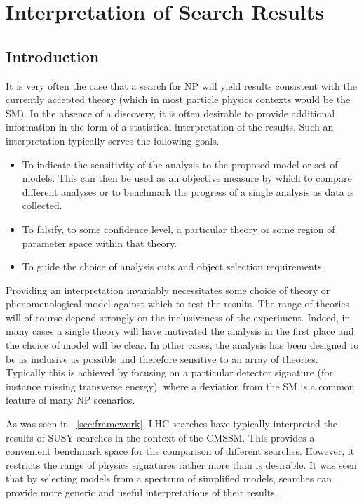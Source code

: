 \chapter{Interpretation of Search Results}
\label{sec:interpretation}
\section{Introduction}
It is very often the case that a search for \ac{NP} will yield results
consistent with the currently accepted theory (which in most particle physics
contexts would be the \ac{SM}). In the absence of a discovery, it is often
desirable to provide additional information in the form of a statistical
interpretation of the results. Such an interpretation typically serves the
following goals.
\begin{itemize}
\item To indicate the sensitivity of the analysis to the proposed model or set
  of models. This can then be used as an objective measure by which to compare
  different analyses or to benchmark the progress of a single analysis as data
  is collected.
\item To falsify, to some confidence level, a particular theory or some region
  of parameter space within that theory.
\item To guide the choice of analysis cuts and object selection requirements.
\end{itemize}

Providing an interpretation invariably necessitates some choice of theory or
phenomenological model against which to test the results. The range of theories
will of course depend strongly on the inclusiveness of the experiment. Indeed,
in many cases a single theory will have motivated the analysis in the first
place and the choice of model will be clear. In other cases, the analysis has
been designed to be as inclusive as possible and therefore sensitive to an array
of theories. Typically this is achieved by focusing on a particular detector
signature (for instance missing transverse energy), where a deviation from the
\ac{SM} is a common feature of many \ac{NP} scenarios.

As was seen in \chap~\ref{sec:framework}, \ac{LHC} searches have typically
interpreted the results of \ac{SUSY} searches in the context of the
\ac{CMSSM}. This provides a convenient benchmark space for the comparison of
different searches. However, it restricts the range of physics signatures rather
more than is desirable. It was seen that by selecting models from a spectrum of
simplified models, searches can provide more generic and useful interpretations
of their results.

